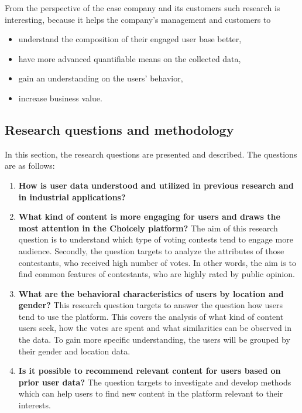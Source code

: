     From the perspective of the case company and its customers such research is interesting, because it helps the company's management and customers to 

    \begin{itemize}
        \item understand the composition of their engaged user base better,
        \item have more advanced quantifiable means on the collected data,
        \item gain an understanding on the users' behavior, 
        \item increase business value.
    \end{itemize} 

\subsection{Research questions and methodology}
    In this section, the research questions are presented and described. The questions are as follows:

    \begin{enumerate}[label=RQ\arabic*:]
        \item \textbf{How is user data understood and utilized in previous research and in industrial applications?}
        \item \textbf{What kind of content is more engaging for users and draws the most attention in the Choicely platform?} The aim of this research question is to understand which type of voting contests tend to engage more audience. Secondly, the question targets to analyze the attributes of those contestants, who received high number of votes. In other words, the aim is to find common features of contestants, who are highly rated by public opinion.     
        \item \textbf{What are the behavioral characteristics of users by location and gender?} This research question targets to answer the question how users tend to use the platform. This covers the analysis of what kind of content users seek, how the votes are spent and what similarities can be observed in the data. To gain more specific understanding, the users will be grouped by their gender and location data.  
        \item \textbf{Is it possible to recommend relevant content for users based on prior user data?} The question targets to investigate and develop methods which can help users to find new content in the platform relevant to their interests.
    \end{enumerate}  

